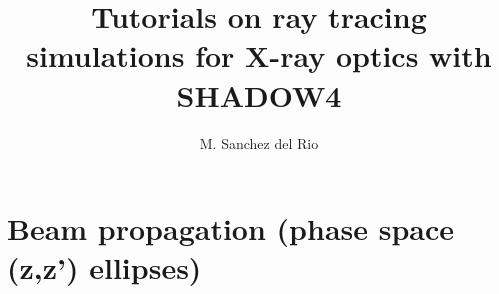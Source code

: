 \documentclass{ol-softwaremanual}
\title{Tutorials on ray tracing simulations for X-ray optics with SHADOW4}
\author{M. Sanchez del Rio}
\begin{document}
\maketitle

\tableofcontents


\newpage
\section{Beam propagation (phase space (z,z’) ellipses)}



\end{document}
